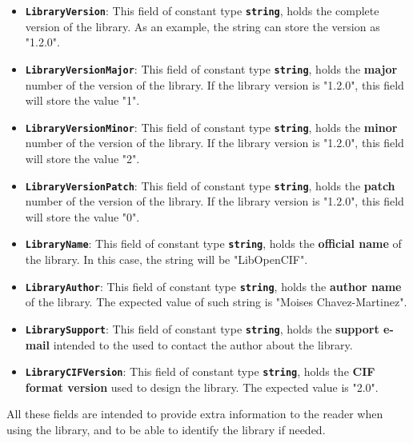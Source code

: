 \documentclass[11pt,twoside,openany,x11names,svgnames]{memoir}
\begin{document}
\begin{itemize}
	\item \textbf{\texttt{LibraryVersion}}: This field of constant type \textbf{\texttt{string}}, holds the complete version of the library. As an example, the string can store the version as "1.2.0".
	
	\item \textbf{\texttt{LibraryVersionMajor}}: This field of constant type \textbf{\texttt{string}}, holds the \textbf{major} number of the version of the library. If the library version is "1.2.0", this field will store the value "1".
	
	\item \textbf{\texttt{LibraryVersionMinor}}: This field of constant type \textbf{\texttt{string}}, holds the \textbf{minor} number of the version of the library. If the library version is "1.2.0", this field will store the value "2".
	
	\item \textbf{\texttt{LibraryVersionPatch}}: This field of constant type \textbf{\texttt{string}}, holds the \textbf{patch} number of the version of the library. If the library version is "1.2.0", this field will store the value "0".
	
	\item \textbf{\texttt{LibraryName}}: This field of constant type \textbf{\texttt{string}}, holds the \textbf{official name} of the library. In this case, the string will be "LibOpenCIF".
	
	\item \textbf{\texttt{LibraryAuthor}}: This field of constant type \textbf{\texttt{string}}, holds the \textbf{author name} of the library. The expected value of such string is "Moises Chavez-Martinez".
	
	\item \textbf{\texttt{LibrarySupport}}: This field of constant type \textbf{\texttt{string}}, holds the \textbf{support e-mail} intended to the used to contact the author about the library.
	
	\item \textbf{\texttt{LibraryCIFVersion}}: This field of constant type \textbf{\texttt{string}}, holds the \textbf{CIF format version} used to design the library. The expected value is "2.0".
\end{itemize}

All these fields are intended to provide extra information to the reader when using the library, and to be able to identify the library if needed.
\end{document}

